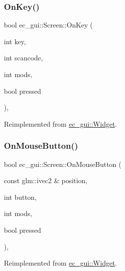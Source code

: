 \subsubsection{\texorpdfstring{On\+Key()}{OnKey()}}
{\footnotesize\ttfamily bool ec\+\_\+gui\+::\+Screen\+::\+On\+Key (\begin{DoxyParamCaption}\item[{int}]{key,  }\item[{int}]{scancode,  }\item[{int}]{mods,  }\item[{bool}]{pressed }\end{DoxyParamCaption})\hspace{0.3cm}{\ttfamily [override]}, {\ttfamily [virtual]}}



Reimplemented from \mbox{\hyperlink{classec__gui_1_1_widget_adcbf1cb953e1cb480635befc379c8e62}{ec\+\_\+gui\+::\+Widget}}.

\mbox{\label{classec__gui_1_1_screen_a2d13abce5d8f8e8332f15949db18c374}} 
\subsubsection{\texorpdfstring{On\+Mouse\+Button()}{OnMouseButton()}}
{\footnotesize\ttfamily bool ec\+\_\+gui\+::\+Screen\+::\+On\+Mouse\+Button (\begin{DoxyParamCaption}\item[{const glm\+::ivec2 \&}]{position,  }\item[{int}]{button,  }\item[{int}]{mods,  }\item[{bool}]{pressed }\end{DoxyParamCaption})\hspace{0.3cm}{\ttfamily [override]}, {\ttfamily [virtual]}}



Reimplemented from \mbox{\hyperlink{classec__gui_1_1_widget_a00bff8173079cc1cb69ec84910715ffb}{ec\+\_\+gui\+::\+Widget}}.

\mbox{\label{classec__gui_1_1_screen_a79cafedae2faa7090fec46e7ad16efd9}} 
